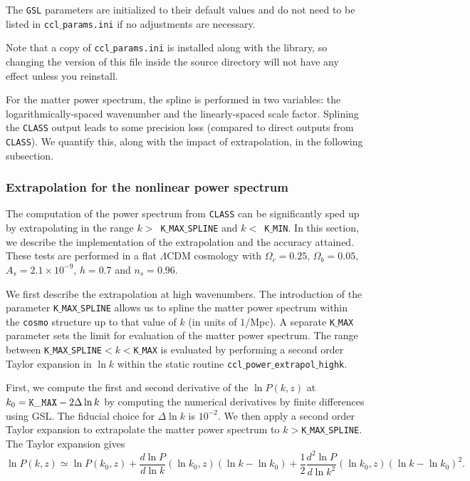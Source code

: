\documentclass[\docopts]{\docclass}
\begin{document}
The {\tt GSL} parameters are initialized to their default values and do not need to be listed in {\tt ccl$\_$params.ini} if no adjustments are necessary.

Note that a copy of {\tt ccl$\_$params.ini} is installed along with the library, so changing the version of this file inside the source directory will not have any effect unless you reinstall.

For the matter power spectrum, the spline is performed in two variables: the logarithmically-spaced wavenumber and the linearly-spaced scale factor. Splining the {\tt CLASS} output leads to some precision loss (compared to direct outputs from {\tt CLASS}). We quantify this, along with the impact of extrapolation, in the following subsection.

\subsubsection{Extrapolation for the nonlinear power spectrum}
\label{sec:NLextrapol}

The computation of the power spectrum from {\tt CLASS} can be significantly sped up by extrapolating in the range $k>$~{\tt K$\_$MAX$\_$SPLINE} and $k<$~{\tt K$\_$MIN}. In this section, we describe the implementation of the extrapolation and the accuracy attained. These tests are performed in a flat $\Lambda$CDM cosmology with $\Omega_c=0.25$, $\Omega_b=0.05$, $A_s=2.1\times10^{-9}$, $h=0.7$ and $n_s=0.96$.

We first describe the extrapolation at high wavenumbers. The introduction of the parameter {\tt K$\_$MAX$\_$SPLINE} allows us to spline the matter power spectrum within the {\tt cosmo} structure up to that value of $k$ (in units of $1/$Mpc). A separate {\tt K$\_$MAX} parameter sets the limit for evaluation of the matter power spectrum. The range between {\tt K$\_$MAX$\_$SPLINE}$<k<${\tt K$\_$MAX} is evaluated by performing a second order Taylor expansion in $\ln k$ within the static routine {\tt ccl$\_$power$\_$extrapol$\_$highk}.

First, we compute the first and second derivative of the $\ln P(k,z)$ at $k_0={\rm \tt K\_MAX}-2\Delta\ln k$ by computing the numerical derivatives by finite differences using GSL. The fiducial choice for $\Delta\ln k$ is $10^{-2}$. We then apply a second order Taylor expansion to extrapolate the matter power spectrum to $k>${\tt K$\_$MAX$\_$SPLINE}. The Taylor expansion gives
%
\begin{equation}
  \ln P(k,z) \simeq \ln P(k_0,z) + \frac{d\ln P}{d\ln k}(\ln k_0,z) (\ln k-\ln k_0)  + \frac{1}{2}  \frac{d^2\ln P}{d\ln k^2}(\ln k_0,z) (\ln k-\ln k_0)^2.
  \label{eq:NLPSTaylor}
\end{equation}
\end{document}
